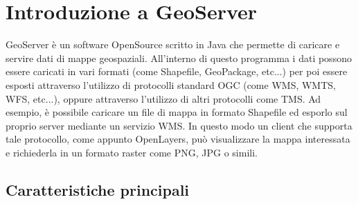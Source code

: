 \section{Introduzione a GeoServer}

GeoServer è un software OpenSource scritto in Java che permette di caricare e servire dati di mappe geospaziali.
All'interno di questo programma i dati possono essere caricati in vari formati (come Shapefile, GeoPackage, etc...) per poi essere esposti attraverso l'utilizzo di protocolli standard OGC (come WMS, WMTS, WFS, etc...), oppure attraverso l'utilizzo di altri protocolli come TMS.
Ad esempio, è possibile caricare un file di mappa in formato Shapefile ed esporlo sul proprio server mediante un servizio WMS.
In questo modo un client che supporta tale protocollo, come appunto OpenLayers, può visualizzare la mappa interessata e richiederla in un formato raster come PNG, JPG o simili.

\subsection{Caratteristiche principali}


